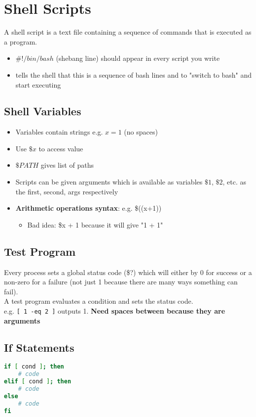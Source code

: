 \documentclass[12pt]{article}
\begin{document}
\section{Shell Scripts}
A shell script is a text file containing a sequence of commands that is executed as a program. 
\begin{itemize}
    \item $\#!/bin/bash$ (shebang line) should appear in every script you write
    \item tells the shell that this is a sequence of bash lines and to "switch to bash" and start executing
\end{itemize}
\subsection{Shell Variables}
\begin{itemize}
    \item Variables contain strings e.g. $x=1$ (no spaces)
    \item Use $\${x}$ to access value
    \item $\$PATH$ gives list of paths
    \item Scripts can be given arguments which is available as variables $\$1$, $\$2$, etc. as the first, second, args respectively
    \item \textbf{Arithmetic operations syntax}: e.g. \$((x+1))
    \begin{itemize}
        \item Bad idea: \$x + 1 because it will give "1 + 1"
    \end{itemize}
\end{itemize}

\subsection{Test Program}
Every process sets a global status code (\$?) which will either by 0 for success or a non-zero for a failure (not just 1 because there are many ways something can fail). \\
A test program evaluates a condition and sets the status code. \\ 
e.g. \lstinline{[ 1 -eq 2 ]} outputs 1. \textbf{Need spaces between because they are arguments}

\subsection{If Statements}
\begin{lstlisting}[language=Bash]
if [ cond ]; then
    # code
elif [ cond ]; then
    # code
else
    # code
fi
\end{lstlisting}
\end{document}
